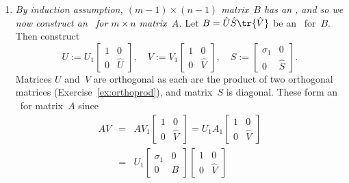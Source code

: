 \begin{enumerate}
\item \emph{By induction assumption, \((m-1)\times(n-1)\) matrix~\(B\) has an \svd, and so we now construct an \svd\ for \(m\times n\) matrix~\(A\).}
Let \(B=\hat U\hat S\tr{\hat V}\) be an \svd\ for~\(B\).
Then construct 
\begin{equation*}
U:=U_1\begin{bmatrix} 1&0\\0&\hat U \end{bmatrix},\quad
V:=V_1\begin{bmatrix} 1&0\\0&\hat V\end{bmatrix},\quad
S:=\begin{bmatrix} \sigma_1&0\\0&\hat S \end{bmatrix}.
\end{equation*}
Matrices \(U\) and~\(V\) are orthogonal as each are the product of two orthogonal matrices (Exercise~\ref{ex:orthoprod}), and matrix~\(S\) is diagonal.
These form an \svd\ for matrix~\(A\) since
\begin{eqnarray*}
AV&=&AV_1\begin{bmatrix} 1&0\\0&\hat V\end{bmatrix}
=U_1A_1\begin{bmatrix} 1&0\\0&\hat V\end{bmatrix}
\\&=&U_1\begin{bmatrix} \sigma_1&0 \\0&B \end{bmatrix}\begin{bmatrix} 1&0\\0&\hat V\end{bmatrix}

\end{eqnarray*}
\end{enumerate}
